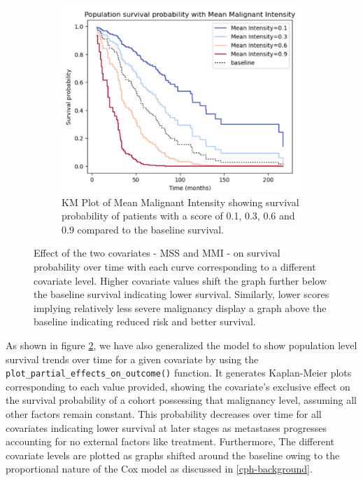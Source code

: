 \documentclass{l4proj}
\begin{document}
\begin{figure}[h]
\begin{subfigure}[b]{0.45\textwidth}
        \includegraphics[scale=0.27]{images/continuous_km.png}
        \caption{KM Plot of Mean Malignant Intensity showing survival probability of patients with a score of 0.1, 0.3, 0.6 and 0.9 compared to the baseline survival.}
        \label{fig:continuous-heatmap}
    \end{subfigure}

    \caption{Effect of the two covariates - MSS and MMI - on survival probability over time with each curve corresponding to a different covariate level. Higher covariate values shift the graph further below the baseline survival indicating lower survival. Similarly, lower scores implying relatively less severe malignancy display a graph above the baseline indicating reduced risk and better survival.}
    \label{fig:KM-plot-result}
\end{figure}

As shown in figure \ref{fig:KM-plot-result}, we have also generalized the model to show population level survival trends over time for a given covariate by using the \texttt{plot\_partial\_effects\_on\_outcome()} function. It generates Kaplan-Meier plots corresponding to each value provided, showing the covariate's exclusive effect on the survival probability of a cohort possessing that malignancy level, assuming all other factors remain constant. This probability decreases over time for all covariates indicating lower survival at later stages as metastases progresses accounting for no external factors like treatment. Furthermore,  The different covariate levels are plotted as graphs shifted around the baseline owing to the proportional nature of the Cox model as discussed in \ref{cph-background}. 
\end{document}
